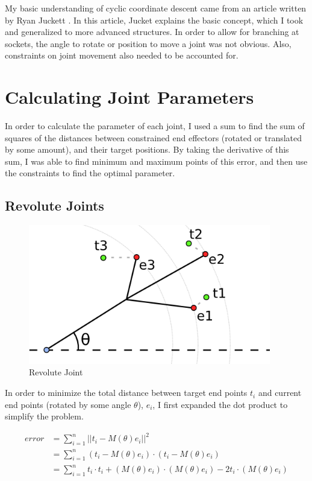 \documentclass{article}
\begin{document}
    My basic understanding of cyclic coordinate descent came from an article
    written by Ryan Juckett \cite{juckett}. In this article, Jucket explains the
    basic concept, which I took and generalized to more advanced structures. In
    order to allow for branching at sockets, the angle to rotate or position to
    move a joint was not obvious. Also, constraints on joint movement also
    needed to be accounted for.

    \section{Calculating Joint Parameters}
    In order to calculate the parameter of each joint, I used a sum to find the
    sum of squares of the distances between constrained end effectors (rotated
    or translated by some amount), and their target positions. By taking the
    derivative of this sum, I was able to find minimum and maximum points of
    this error, and then use the constraints to find the optimal parameter.

    \subsection{Revolute Joints}
    \begin{figure}[H]
        \caption{Revolute Joint}
        \centering
        \includegraphics[width=400px]{revolute.png}
    \end{figure}

    In order to minimize the total distance between target end points $t_i$
    and current end points (rotated by some angle $\theta$), $e_i$, I first
    expanded the dot product to simplify the problem.

    \begin{align}
        error &= \sum_{i=1}^n ||t_i - M(\theta) e_i||^2 \\
              &= \sum_{i=1}^n (t_i - M(\theta) e_i) \cdot (t_i - M(\theta) e_i) \\
              &= \sum_{i=1}^n t_i \cdot t_i + (M(\theta) e_i) \cdot
                  (M(\theta) e_i) - 2 t_i \cdot (M(\theta) e_i)
    \end{align}
\end{document}
